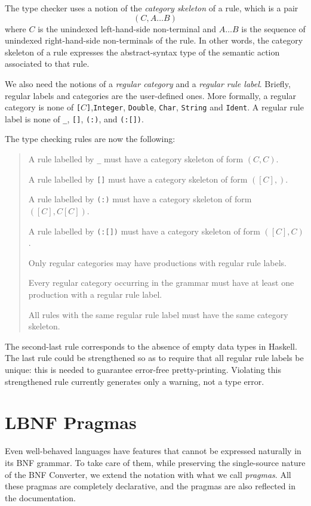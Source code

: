 \documentclass[10pt]{article}
\newcommand{\bequ}{\begin{quote}}
\newcommand{\enqu}{\end{quote}}
\begin{document}
The type checker uses a notion of the 
\textit{category skeleton} of a rule, which is a pair 
\[
  (C, A\ldots B)
\]
where $C$ is the unindexed left-hand-side non-terminal and $A\ldots B$
is the sequence of unindexed right-hand-side non-terminals of the rule. 
In other words, the category skeleton of a rule expresses the abstract-syntax
type of the semantic action associated to that rule.

We also need the notions of
a \textit{regular category} and
a \textit{regular rule label}.
Briefly, regular labels and categories are the user-defined ones.
More formally,
a regular category is none of
{\tt[}$C${\tt]},{\tt Integer}, {\tt Double}, {\tt Char}, {\tt String}
and {\tt Ident}.
A regular rule label is none of
{\tt \_}, {\tt []}, {\tt (:)}, and {\tt (:[])}. 

The type checking rules are now the following:
\bequ
A rule labelled by {\tt \_} must have a category skeleton of form $(C,C)$.

A rule labelled by {\tt []} must have a category skeleton of form $([C],)$.
 
A rule labelled by {\tt (:)} must have a category skeleton of form $([C],C[C])$.

A rule labelled by {\tt (:[])} must have a category skeleton of form $([C],C)$.

Only regular categories may have productions with regular rule labels.

Every regular category occurring in the grammar
must have at least one production with a regular rule label.

All rules with the same regular rule label must have the same
category skeleton.
\enqu
The second-last rule corresponds to the absence of empty data types in Haskell.
The last rule could 
be strengthened so as to require that all regular rule labels be unique: 
this is needed to guarantee error-free pretty-printing. 
Violating this strengthened rule currently
generates only a warning, not a type error.



\section{LBNF Pragmas}

Even well-behaved languages have features that
cannot be expressed naturally in its BNF grammar.
To take care of them, while preserving the single-source nature of
the BNF Converter, we extend the notation with what we call \textit{pragmas}.
All these pragmas are completely declarative, and the pragmas are also 
reflected in the documentation.
\end{document}
